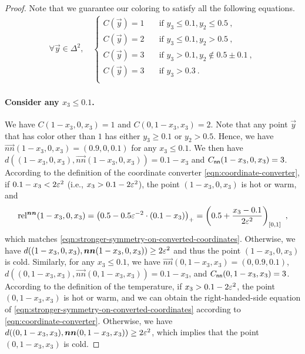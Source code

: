 \begin{proof}
    Note that we guarantee our coloring to satisfy all the following equations.
    \begin{align*}
        \forall \vec{y}\in \Delta^2, \quad
        \begin{cases}
        C(\vec{y}) = 1 & \quad \text{if } y_3\leq 0.1, y_2\leq  0.5~,\\
        C(\vec{y}) = 2 & \quad \text{if } y_3\leq 0.1, y_2> 0.5~,\\
        C(\vec{y}) = 3 & \quad \text{if } y_3> 0.1, y_2\notin 0.5\pm 0.1~,\\
        C(\vec{y}) = 3 & \quad \text{if } y_3>0.3 ~.\\
        \end{cases}
    \end{align*}

    \paragraph{Consider any $x_3\leq 0.1$.} 
    We have $C(1-x_3,0,x_3)=1$ and $C(0,1-x_3,x_3)=2$. 
    Note that any point $\vec{y}$ that has color other than $1$ has either $y_3\geq 0.1$ or $y_2>0.5$. 
    Hence, we have $\vec{nn}(1-x_3,0,x_3)=(0.9,0,0.1)$ for any $x_3\leq 0.1$. 
    We then have $d((1-x_3,0,x_3), \vec{nn}(1-x_3,0,x_3))=0.1-x_3$ and $C_{\sf nn}(1-x_3,0,x_3)=3$.
    According to the definition of the coordinate converter \cref{eqn:coordinate-converter}, if $0.1-x_3< 2\varepsilon^2$ (i.e., $x_3> 0.1-2\varepsilon^2$), the point $(1-x_3,0,x_3)$ is hot or warm, and
    \begin{align*}
        \operatorname*{rel^{\boldsymbol{nn}}}(1-x_3,0,x_3) = \left(0.5-0.5\varepsilon^{-2}\cdot (0.1-x_3)\right)_+ = \left(0.5 + \frac{x_3-0.1}{2\varepsilon^2}\right)_{[0,1]}~,
    \end{align*}
    which matches \cref{eqn:stronger-symmetry-on-converted-coordinates}.
    Otherwise, we have $d((1-x_3,0,x_3), \boldsymbol{nn}(1-x_3,0,x_3))\geq 2\varepsilon^2$ and thus the point $(1-x_3,0,x_3)$ is cold.
    Similarly, for any $x_3\leq 0.1$, we have $\vec{nn}(0,1-x_3,x_3)=(0,0.9,0.1)$, $d((0,1-x_3,x_3), \vec{nn}(0,1-x_3,x_3))=0.1-x_3$, and $C_{\sf nn}(0,1-x_3,x_3)=3$.
    According to the definition of the temperature, if $x_3>0.1-2\varepsilon^2$, the point $(0,1-x_3,x_3)$ is hot or warm, and we can obtain the right-handed-side equation of \cref{eqn:stronger-symmetry-on-converted-coordinates} according to \cref{eqn:coordinate-converter}. 
    Otherwise, we have $d((0,1-x_3,x_3), \boldsymbol{nn}(0,1-x_3,x_3))\geq 2\varepsilon^2$, which implies that the point $(0,1-x_3,x_3)$ is cold.


\end{proof}
